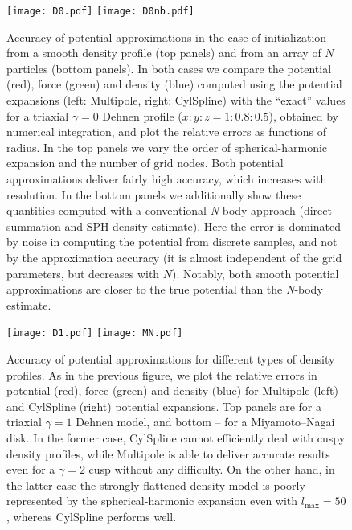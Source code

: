\documentclass[12pt]{article}
\newcommand{\Nbody}{\textsl{N}-body\xspace}
\begin{document}
\begin{figure}
\texttt{[image: D0.pdf]}
\texttt{[image: D0nb.pdf]}
\caption{Accuracy of potential approximations in the case of initialization from a smooth density profile (top panels) and from an array of $N$ particles (bottom panels). In both cases we compare the potential (red), force (green) and density (blue) computed using the potential expansions (left: Multipole, right: CylSpline) with the ``exact'' values for a triaxial $\gamma=0$ Dehnen profile ($x:y:z=1:0.8:0.5$), obtained by numerical integration, and plot the relative errors as functions of radius. In the top panels we vary the order of spherical-harmonic expansion and the number of grid nodes. Both potential approximations deliver fairly high accuracy, which increases with resolution. In the bottom panels we additionally show these quantities computed with a conventional \Nbody approach (direct-summation and SPH density estimate). Here the error is dominated by noise in computing the potential from discrete samples, and not by the approximation accuracy (it is almost independent of the grid parameters, but decreases with $N$). Notably, both smooth potential approximations are closer to the true potential than the \Nbody estimate.
}  \label{fig:PotentialAccuracy1}
\end{figure}

\begin{figure}
\texttt{[image: D1.pdf]}
\texttt{[image: MN.pdf]}
\caption{Accuracy of potential approximations for different types of density profiles. As in the previous figure, we plot the relative errors in potential (red), force (green) and density (blue) for Multipole (left) and CylSpline (right) potential expansions. Top panels are for a triaxial $\gamma=1$ Dehnen model, and bottom -- for a Miyamoto--Nagai disk. In the former case, CylSpline cannot efficiently deal with cuspy density profiles, while Multipole is able to deliver accurate results even for a $\gamma=2$ cusp without any difficulty. On the other hand, in the latter case the strongly flattened density model is poorly represented by the spherical-harmonic expansion even with $l_\mathrm{max}=50$, whereas CylSpline performs well.
}  \label{fig:PotentialAccuracy2}
\end{figure}
\end{document}
